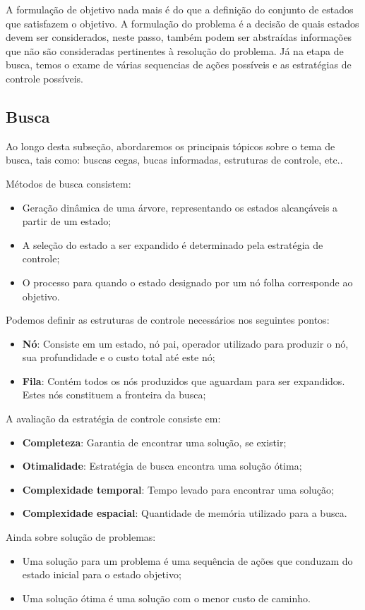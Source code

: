 \documentclass[12pt]{article}
\begin{document}
A formulação de objetivo nada mais é do que a definição do conjunto de estados que satisfazem o objetivo.
A formulação do problema é a decisão de quais estados devem ser considerados, neste passo, também podem ser abstraídas informações que não são consideradas pertinentes à resolução do problema.
Já na etapa de busca, temos o exame de várias sequencias de ações possíveis e as estratégias de controle possíveis.

\subsection{Busca}
Ao longo desta subseção, abordaremos os principais tópicos sobre o tema de busca, tais como: buscas cegas, bucas informadas, estruturas de controle, etc..

Métodos de busca consistem:
\begin{itemize}
    \item Geração dinâmica de uma árvore, representando os estados alcançáveis a partir de um estado;
    \item A seleção do estado a ser expandido é determinado pela estratégia de controle;
    \item O processo para quando o estado designado por um nó folha corresponde ao objetivo.
\end{itemize}

Podemos definir as estruturas de controle necessários nos seguintes pontos:

\begin{itemize}
    \item \textbf{Nó}: Consiste em um estado, nó pai, operador utilizado para produzir o nó, sua profundidade e o custo total até este nó;
    \item \textbf{Fila}: Contém todos os nós produzidos que aguardam para ser expandidos. Estes nós constituem a fronteira da busca;
\end{itemize}
A avaliação da estratégia de controle consiste em:
\begin{itemize}
    \item \textbf{Completeza}: Garantia de encontrar uma solução, se existir;
    \item \textbf{Otimalidade}: Estratégia de busca encontra uma solução ótima;
    \item \textbf{Complexidade temporal}: Tempo levado para encontrar uma solução;
    \item \textbf{Complexidade espacial}: Quantidade de memória utilizado para a busca.
\end{itemize}
Ainda sobre solução de problemas: 
\begin{itemize}
    \item Uma solução para um problema é uma sequência de ações que conduzam do estado inicial para o estado objetivo;
    \item Uma solução ótima é uma solução com o menor custo de caminho.
\end{itemize}
\end{document}
